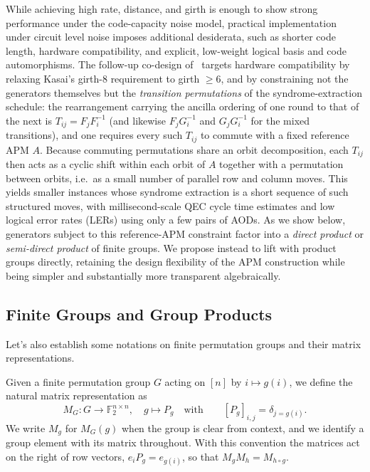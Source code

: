 While achieving high rate, distance, and girth is enough to show strong performance under the code-capacity noise model, practical implementation under circuit level noise imposes additional desiderata, such as shorter code length, hardware compatibility, and explicit, low-weight logical basis and code automorphisms. The follow-up co-design of~\cite{zhao2026ultrahighratequantumerrorcorrection} targets hardware compatibility by relaxing Kasai's girth-$8$ requirement to girth $\geq 6$, and by constraining not the generators themselves but the \emph{transition permutations} of the syndrome-extraction schedule: the rearrangement carrying the ancilla ordering of one round to that of the next is $T_{ij} = F_jF_i^{-1}$ (and likewise $F_jG_i^{-1}$ and $G_jG_i^{-1}$ for the mixed transitions), and one requires every such $T_{ij}$ to commute with a fixed reference APM $A$. Because commuting permutations share an orbit decomposition, each $T_{ij}$ then acts as a cyclic shift within each orbit of $A$ together with a permutation between orbits, i.e.\ as a small number of parallel row and column moves. This yields smaller instances whose syndrome extraction is a short sequence of such structured moves, with millisecond-scale QEC cycle time estimates and low logical error rates (LERs) using only a few pairs of AODs. As we show below, generators subject to this reference-APM constraint factor into a \emph{direct product} or \emph{semi-direct product} of finite groups. We propose instead to lift with product groups directly, retaining the design flexibility of the APM construction while being simpler and substantially more transparent algebraically.

\subsection{Finite Groups and Group Products}\label{ssec:groups}

Let's also establish some notations on finite permutation groups and their matrix representations. 

\begin{definition}\label{def:mtx-perm}
Given a finite permutation group $G$ acting on $[n]$ by $i\mapsto g(i)$, we define the natural matrix representation as
$$
     M_G : G \to \mathbb F_2^{n\times n},\quad g\mapsto P_g \quad \text{with} \qquad [P_g]_{i,j} = \delta_{j = g(i)}.
$$
We write $M_g$ for $M_G(g)$ when the group is clear from context, and we identify a group element with its matrix throughout. With this convention the matrices act on the right of row vectors, $e_i P_g = e_{g(i)}$, so that $M_gM_h = M_{h\circ g}$.
\end{definition}

